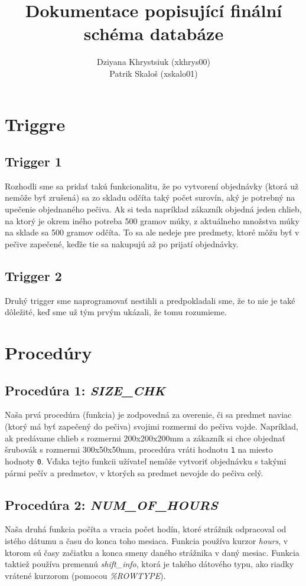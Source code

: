 \documentclass[a4paper]{article}
\title{Dokumentace popisující finální schéma databáze}
\author{Dziyana Khrystsiuk (xkhrys00) \\ Patrik Skaloš (xskalo01)}
\date{}
\begin{document}
  \maketitle


  \section{Triggre}

  \subsection{Trigger 1}
  Rozhodli sme sa pridať takú funkcionalitu, že po vytvorení objednávky (ktorá
  už nemôže byť zrušená) sa zo skladu odčíta taký počet surovín, aký je potrebný
  na upečenie objednaného pečiva. Ak si teda napríklad zákazník objedná jeden 
  chlieb, na ktorý je okrem iného potreba 500 gramov múky, z aktuálneho množstva
  múky na sklade sa 500 gramov odčíta. To sa ale nedeje pre predmety, ktoré môžu
  byť v pečive zapečené, keďže tie sa nakupujú až po prijatí objednávky.

  \subsection{Trigger 2}
  Druhý trigger sme naprogramovať nestihli a predpokladali sme, že to nie je
  také dôležité, keď sme už tým prvým ukázali, že tomu rozumieme.


  \section{Procedúry}

  \subsection{Procedúra 1: \textit{SIZE\_CHK}}
  Naša prvá procedúra (funkcia) je zodpovedná za overenie, či sa predmet naviac
  (ktorý má byť zapečený do pečiva) svojimi rozmermi do pečiva vojde. Napríklad,
  ak predávame chlieb s rozmermi 200x200x200mm a zákazník si chce objednať 
  šrubovák s rozmermi 300x50x50mm, procedúra vráti hodnotu \verb|1| na miesto
  hodnoty \verb|0|. Vďaka tejto funkcii užívateľ nemôže vytvoriť objednávku s
  takými pármi pečív a predmetov, v ktorých sa predmet nevojde do pečiva celý.

  \subsection{Procedúra 2: \textit{NUM\_OF\_HOURS}}
  Naša druhá funkcia počíta a vracia počet hodín, ktoré strážnik odpracoval
  od istého dátumu a času do konca toho mesiaca. Funkcia používa kurzor 
  \textit{hours}, v ktorom sú časy začiatku a konca smeny daného strážnika v 
  daný mesiac. Funkcia taktiež používa premennú \textit{shift\_info}, ktorá je
  takého dátového typu, ako riadky vrátené kurzorom (pomocou \textit{\%ROWTYPE}).
\end{document}
